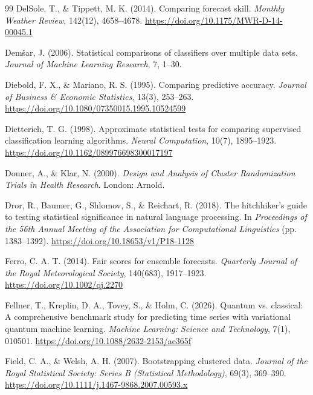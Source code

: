 \documentclass[11pt,a4paper]{article}
\begin{document}
\begin{thebibliography}{99}
DelSole, T., \& Tippett, M. K. (2014). Comparing forecast skill. \textit{Monthly Weather Review}, 142(12), 4658--4678. \url{https://doi.org/10.1175/MWR-D-14-00045.1}

Dem\v{s}ar, J. (2006). Statistical comparisons of classifiers over multiple data sets. \textit{Journal of Machine Learning Research}, 7, 1--30.

Diebold, F. X., \& Mariano, R. S. (1995). Comparing predictive accuracy. \textit{Journal of Business \& Economic Statistics}, 13(3), 253--263. \url{https://doi.org/10.1080/07350015.1995.10524599}

Dietterich, T. G. (1998). Approximate statistical tests for comparing supervised classification learning algorithms. \textit{Neural Computation}, 10(7), 1895--1923. \url{https://doi.org/10.1162/089976698300017197}

Donner, A., \& Klar, N. (2000). \textit{Design and Analysis of Cluster Randomization Trials in Health Research}. London: Arnold.

Dror, R., Baumer, G., Shlomov, S., \& Reichart, R. (2018). The hitchhiker's guide to testing statistical significance in natural language processing. In \textit{Proceedings of the 56th Annual Meeting of the Association for Computational Linguistics} (pp. 1383--1392). \url{https://doi.org/10.18653/v1/P18-1128}

Ferro, C. A. T. (2014). Fair scores for ensemble forecasts. \textit{Quarterly Journal of the Royal Meteorological Society}, 140(683), 1917--1923. \url{https://doi.org/10.1002/qj.2270}

Fellner, T., Kreplin, D. A., Tovey, S., \& Holm, C. (2026). Quantum vs. classical: A comprehensive benchmark study for predicting time series with variational quantum machine learning. \textit{Machine Learning: Science and Technology}, 7(1), 010501. \url{https://doi.org/10.1088/2632-2153/ae365f}

Field, C. A., \& Welsh, A. H. (2007). Bootstrapping clustered data. \textit{Journal of the Royal Statistical Society: Series B (Statistical Methodology)}, 69(3), 369--390. \url{https://doi.org/10.1111/j.1467-9868.2007.00593.x}


\end{thebibliography}
\end{document}
